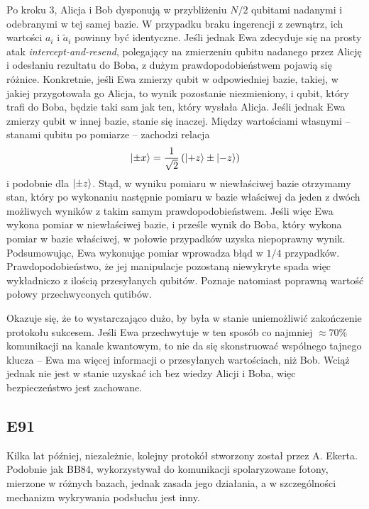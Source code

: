 \documentclass[10pt]{article}
\begin{document}
Po kroku 3, Alicja i Bob dysponują w przybliżeniu \(N/2\) qubitami nadanymi i odebranymi w tej samej
bazie. W przypadku braku ingerencji z zewnątrz, ich wartości \(a_i\) i \(\tilde{a}_i\) powinny być
identyczne. Jeśli jednak Ewa zdecyduje się na prosty atak \emph{intercept-and-resend}, polegający
na zmierzeniu qubitu nadanego przez Alicję i odesłaniu rezultatu do Boba, z dużym prawdopodobieństwem
pojawią się różnice. Konkretnie, jeśli Ewa zmierzy qubit w odpowiedniej bazie, takiej, w jakiej
przygotowała go Alicja, to wynik pozostanie niezmieniony, i qubit, który trafi do Boba, będzie taki
sam jak ten, który wysłała Alicja. Jeśli jednak Ewa zmierzy qubit w innej bazie, stanie się inaczej.
Między wartościami własnymi -- stanami qubitu po pomiarze -- zachodzi relacja
\[
\Ket{\pm x}=\frac{1}{\sqrt{2}}\left(\Ket{+z}\pm\Ket{-z}\right)
\]
i podobnie dla \(\Ket{\pm z}\). Stąd, w wyniku pomiaru w niewłaściwej bazie otrzymamy stan, który
po wykonaniu następnie pomiaru w bazie właściwej da jeden z dwóch możliwych wyników z takim samym
prawdopodobieństwem. Jeśli więc Ewa wykona pomiar w niewłaściwej bazie, i prześle wynik do Boba,
który wykona pomiar w bazie właściwej, w połowie przypadków uzyska niepoprawny wynik. Podsumowując,
Ewa wykonując pomiar wprowadza błąd w \(1/4\) przypadków. Prawdopodobieństwo, że jej manipulacje
pozostaną niewykryte spada więc wykładniczo z ilością przesyłanych qubitów. Poznaje natomiast 
poprawną wartość połowy przechwyconych qutibów. 

Okazuje się, że to wystarczająco dużo, by była w stanie uniemożliwić zakończenie protokołu sukcesem.
Jeśli Ewa przechwytuje w ten sposób co najmniej \(\approx 70\%\) komunikacji na kanale kwantowym, to 
nie da się skonstruować wspólnego tajnego klucza -- Ewa ma więcej informacji o przesyłanych wartościach, 
niż Bob\cite{Csiszar78,Scarani09}. Wciąż jednak nie jest w stanie uzyskać ich bez wiedzy Alicji
i Boba, więc bezpieczeństwo jest zachowane.

\subsection{E91}

Kilka lat później, niezależnie, kolejny protokół stworzony został przez A. Ekerta\cite{Ekert91,Ekert12}.
Podobnie jak BB84, wykorzystywał do komunikacji spolaryzowane fotony, mierzone w różnych bazach,
jednak zasada jego działania, a w szczególności mechanizm wykrywania podsłuchu jest inny.
\end{document}
